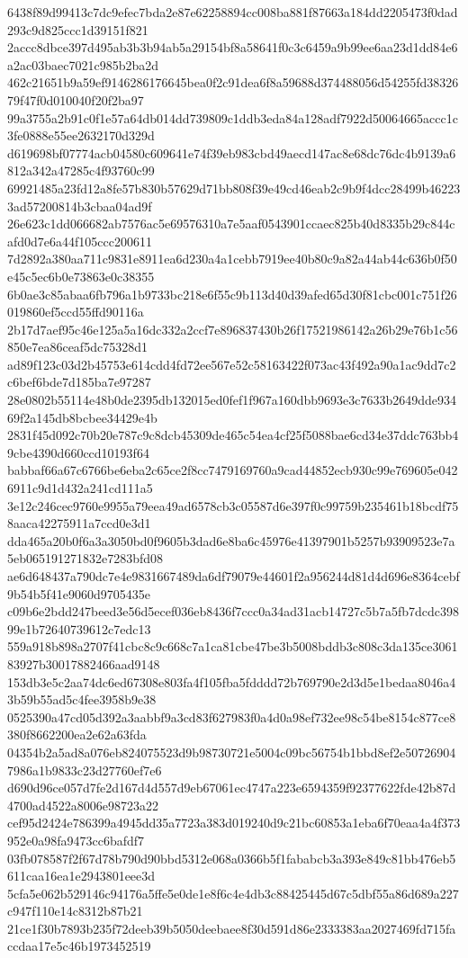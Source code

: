 {6438f89d99413c7dc9efec7bda2e87e62258894cc008ba881f87663a184dd2205473f0dad293c9d825ccc1d39151f821
2accc8dbce397d495ab3b3b94ab5a29154bf8a58641f0c3c6459a9b99ee6aa23d1dd84e6a2ac03baec7021c985b2ba2d
462c21651b9a59ef9146286176645bea0f2c91dea6f8a59688d374488056d54255fd3832679f47f0d010040f20f2ba97
99a3755a2b91c0f1e57a64db014dd739809c1ddb3eda84a128adf7922d50064665accc1c3fe0888e55ee2632170d329d
d619698bf07774acb04580c609641e74f39eb983cbd49aecd147ac8e68dc76dc4b9139a6812a342a47285c4f93760c99
69921485a23fd12a8fe57b830b57629d71bb808f39e49cd46eab2c9b9f4dcc28499b462233ad57200814b3cbaa04ad9f
26e623c1dd066682ab7576ac5e69576310a7e5aaf0543901ccaec825b40d8335b29c844cafd0d7e6a44f105ccc200611
7d2892a380aa711c9831e8911ea6d230a4a1cebb7919ee40b80c9a82a44ab44c636b0f50e45c5ec6b0e73863e0c38355
6b0ae3c85abaa6fb796a1b9733bc218e6f55c9b113d40d39afed65d30f81cbc001c751f26019860ef5ccd55ffd90116a
2b17d7aef95c46e125a5a16dc332a2ccf7e896837430b26f17521986142a26b29e76b1c56850e7ea86ceaf5dc75328d1
ad89f123c03d2b45753e614cdd4fd72ee567e52c58163422f073ac43f492a90a1ac9dd7c2c6bef6bde7d185ba7e97287
28e0802b55114e48b0de2395db132015ed0fef1f967a160dbb9693e3c7633b2649dde93469f2a145db8bcbee34429e4b
2831f45d092c70b20e787c9c8dcb45309de465c54ea4cf25f5088bae6cd34e37ddc763bb49cbe4390d660ccd10193f64
babbaf66a67c6766be6eba2c65ce2f8cc7479169760a9cad44852ecb930c99e769605e0426911c9d1d432a241cd111a5
3e12c246cec9760e9955a79eea49ad6578cb3c05587d6e397f0c99759b235461b18bcdf758aaca42275911a7ccd0e3d1
dda465a20b0f6a3a3050bd0f9605b3dad6e8ba6c45976e41397901b5257b93909523e7a5eb065191271832e7283bfd08
ae6d648437a790dc7e4e9831667489da6df79079e44601f2a956244d81d4d696e8364cebf9b54b5f41e9060d9705435e
c09b6e2bdd247beed3e56d5ecef036eb8436f7ccc0a34ad31acb14727c5b7a5fb7dcdc39899e1b72640739612c7edc13
559a918b898a2707f41cbc8c9c668c7a1ca81cbe47be3b5008bddb3c808c3da135ce306183927b30017882466aad9148
153db3e5c2aa74dc6ed67308e803fa4f105fba5fdddd72b769790e2d3d5e1bedaa8046a43b59b55ad5c4fee3958b9e38
0525390a47cd05d392a3aabbf9a3cd83f627983f0a4d0a98ef732ee98c54be8154c877ce8380f8662200ea2e62a63fda
04354b2a5ad8a076eb824075523d9b98730721e5004c09bc56754b1bbd8ef2e507269047986a1b9833c23d27760ef7e6
d690d96ce057d7fe2d167d4d557d9eb67061ec4747a223e6594359f92377622fde42b87d4700ad4522a8006e98723a22
cef95d2424e786399a4945dd35a7723a383d019240d9c21bc60853a1eba6f70eaa4a4f373952e0a98fa9473cc6bafdf7
03fb078587f2f67d78b790d90bbd5312e068a0366b5f1fababcb3a393e849c81bb476eb5611caa16ea1e2943801eee3d
5cfa5e062b529146c94176a5ffe5e0de1e8f6c4e4db3c88425445d67c5dbf55a86d689a227c947f110e14c8312b87b21
21ce1f30b7893b235f72deeb39b5050deebaee8f30d591d86e2333383aa2027469fd715faccdaa17e5c46b1973452519
}
